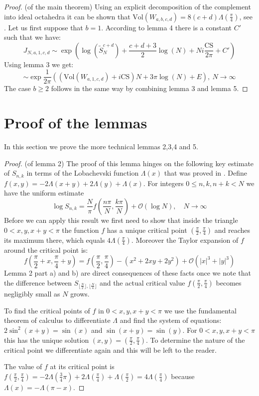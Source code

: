 \documentclass[letterpaper]{article}
\begin{document}
\begin{proof} (of the main theorem)\newline
Using an explicit decomposition of the complement into ideal
octahedra it can be shown that $\mathrm{Vol}(W_{a,b,c,d}) =
8(c+d)\Lambda(\frac{\pi}{4})$, see \cite{van der Veen}. Let us
first suppose that $b = 1$. According to lemma 4 there is a
constant $C'$ such that we have: $$J_{N,a,1,c,d}\sim
\exp\left(\log(\tilde{S}_N^{c+d})+\frac{c+d+3}{2}\log(N)+Ni\frac{\mathrm{CS}}{2\pi}+
C' \right)$$ Using lemma 3 we get:
$$\sim \exp\frac{1}{2\pi}\left((\mathrm{Vol}(W_{a,1,c,d})+i\mathrm{CS})N + 3\pi\log(N)+ E\right),\  N\to\infty$$
The case $b \geq 2$ follows in the same way by combining lemma 3 and lemma 5.
\end{proof}

\section{Proof of the lemmas}

In this section we prove the more technical lemmas 2,3,4 and 5.
\begin{proof} (of lemma 2)
The proof of this lemma hinges on the following key estimate of
$S_{n,k}$ in terms of the Lobachevski function $\Lambda(x)$ that was proved
in \cite{HaoZheng}. Define $f(x,y)=
-2\Lambda(x+y)+2\Lambda(y)+\Lambda(x)$. For integers $0\leq n,k, n+k < N$
we have the uniform estimate
$$\log S_{n,k}=\frac{N}{\pi}f(\frac{n\pi}{N},\frac{k\pi}{N})+\mathcal{O}(\log N),\quad N\to \infty$$
Before we can apply this result we first need to show that inside the
triangle $0<x,y,x+y<\pi$ the function $f$ has a unique critical
point $(\frac{\pi}{2},\frac{\pi}{4})$ and reaches its maximum
there, which equals $4\Lambda(\frac{\pi}{4})$. Moreover the Taylor
expansion of $f$ around the critical point is:
$$f(\frac{\pi}{2}+x,\frac{\pi}{4}+y)=f(\frac{\pi}{2},\frac{\pi}{4})-(x^2+2xy+2y^2)+\mathcal{O}(|x|^3+|y|^3)$$
Lemma 2 part a) and b) are direct consequences of these facts once
we note that the difference between $S_{\lfloor
\frac{N}{2}\rfloor,\lfloor \frac{N}{4}\rfloor}$ and the actual
critical value $f(\frac{\pi}{2},\frac{\pi}{4})$ becomes negligibly
small as $N$ grows.

To find the critical points of $f$ in $0<x,y,x+y<\pi$ we use the fundamental theorem of calculus to differentiate $\Lambda$ and
find the system of equations: $2\sin^2(x+y)=\sin(x)$ and
$\sin(x+y)=\sin(y)$. For $0<x,y,x+y<\pi$ this has the unique solution $(x,y)=(\frac{\pi}{2},\frac{\pi}{4})$. To determine the nature of the critical
point we differentiate again and this will be left to the reader.

The value of $f$ at its critical point is
$f(\frac{\pi}{2},\frac{\pi}{4})=-2\Lambda(\frac{3}{4}\pi)+2\Lambda(\frac{\pi}{4})+\Lambda(\frac{\pi}{2})=4\Lambda(\frac{\pi}{4})$
because $\Lambda(x)=-\Lambda(\pi-x)$.
\end{proof}
\end{document}
